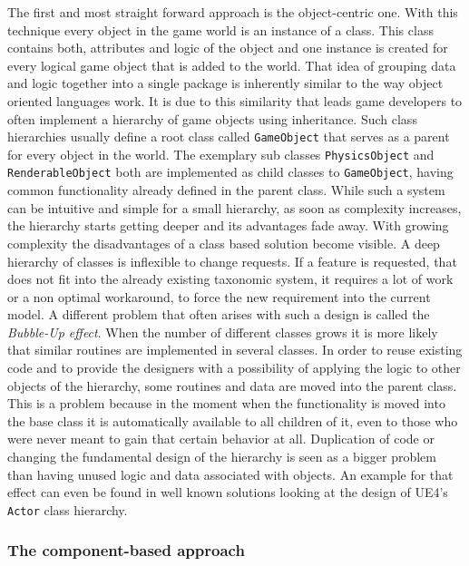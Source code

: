 The first and most straight forward approach is the object-centric one. With this technique every object in the game world is an instance of a class. This class contains both, attributes and logic of the object and one instance is created for every logical game object that is added to the world. That idea of grouping data and logic together into a single package is inherently similar to the way object oriented languages work. It is due to this similarity that leads game developers to often implement a hierarchy of game objects using inheritance. Such class hierarchies usually define a root class called \texttt{GameObject} that serves as a parent for every object in the world. The exemplary sub classes \texttt{PhysicsObject} and \texttt{RenderableObject} both are implemented as child classes to \texttt{GameObject}, having common functionality already defined in the parent class. While such a system can be intuitive and simple for a small hierarchy, as soon as complexity increases, the hierarchy starts getting deeper and its advantages fade away. With growing complexity the disadvantages of a class based solution become visible. A deep hierarchy of classes is inflexible to change requests. If a feature is requested, that does not fit into the already existing taxonomic system, it requires a lot of work or a non optimal workaround, to force the new requirement into the current model. 
A different problem that often arises with such a design is called the \textit{Bubble-Up effect}. When the number of different classes grows it is more likely that similar routines are implemented in several classes. In order to reuse existing code and to provide the designers with a possibility of applying the logic to other objects of the hierarchy, some routines and data are moved into the parent class. This is a problem because in the moment when the functionality is moved into the base class it is automatically available to all children of it, even to those who were never meant to gain that certain behavior at all. Duplication of code or changing the fundamental design of the hierarchy is seen as a bigger problem than having unused logic and data associated with objects. An example for that effect can even be found in well known solutions looking at the design of \ac{UE4}'s \texttt{Actor} class hierarchy.

\subsubsection{The component-based approach}

